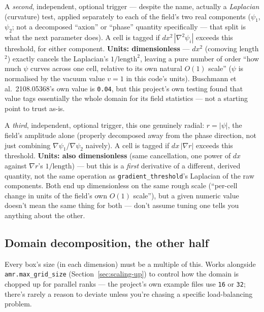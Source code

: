 \documentclass[11pt]{article}
\begin{document}
\begin{description}[style=nextline,leftmargin=1.2em,itemsep=0.4em]
\item[\texttt{axion\_strings.tagging.gradient\_threshold}]
  A \emph{second}, independent, optional trigger --- despite the name, actually a \emph{Laplacian}
  (curvature) test, applied separately to each of the field's two real components ($\psi_1$, $\psi_2$; not
  a decomposed ``axion'' or ``phase'' quantity specifically --- that split is what the next parameter does).
  A cell is tagged if $dx^2\,|\nabla^2\psi_i|$ exceeds this threshold, for either component.
  \textbf{Units: dimensionless} --- $dx^2$ (comoving length$^2$) exactly cancels the Laplacian's
  $1/\mathrm{length}^2$, leaving a pure number of order ``how much $\psi$ curves across one cell, relative to
  its own natural $O(1)$ scale'' ($\psi$ is normalised by the vacuum value $v=1$ in this code's units).
  Buschmann et al.\ 2108.05368's own value is \texttt{0.04}, but this project's own testing found that value
  tags essentially the whole domain for its field statistics --- not a starting point to trust as-is.
\item[\texttt{axion\_strings.tagging.radial\_gradient\_threshold}]
  A \emph{third}, independent, optional trigger, this one genuinely radial: $r=|\psi|$, the field's
  amplitude alone (properly decomposed away from the phase direction, not just combining
  $\nabla\psi_1$/$\nabla\psi_2$ naively). A cell is tagged if $dx\,|\nabla r|$ exceeds this threshold.
  \textbf{Units: also dimensionless} (same cancellation, one power of $dx$ against $\nabla r$'s
  $1/\mathrm{length}$) --- but this is a \emph{first} derivative of a different, derived quantity, not the
  same operation as \texttt{gradient\_threshold}'s Laplacian of the raw components. Both end up
  dimensionless on the same rough scale (``per-cell change in units of the field's own $O(1)$ scale''), but
  a given numeric value doesn't mean the same thing for both --- don't assume tuning one tells you anything
  about the other.
\end{description}

\subsection{Domain decomposition, the other half}

\begin{description}[style=nextline,leftmargin=1.2em,itemsep=0.4em]
\item[\texttt{amr.blocking\_factor}]
  Every box's size (in each dimension) must be a multiple of this. Works alongside
  \texttt{amr.max\_grid\_size} (Section~\ref{sec:scaling-up}) to control how the domain is chopped up for
  parallel ranks --- the project's own example files use \texttt{16} or \texttt{32}; there's rarely a
  reason to deviate unless you're chasing a specific load-balancing problem.
\end{description}
\end{document}
